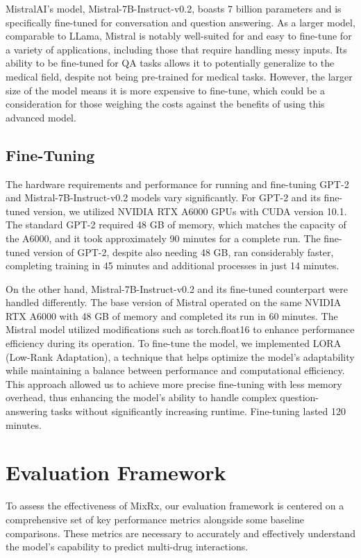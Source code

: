 \documentclass[11pt]{article}
\begin{document}
MistralAI's model, Mistral-7B-Instruct-v0.2, boasts 7 billion parameters and is specifically fine-tuned for conversation and question answering. As a larger model, comparable to LLama, Mistral is notably well-suited for and easy to fine-tune for a variety of applications, including those that require handling messy inputs. Its ability to be fine-tuned for QA tasks allows it to potentially generalize to the medical field, despite not being pre-trained for medical tasks. However, the larger size of the model means it is more expensive to fine-tune, which could be a consideration for those weighing the costs against the benefits of using this advanced model.

\subsection{Fine-Tuning}
The hardware requirements and performance for running and fine-tuning GPT-2 \cite{radford2019language} and Mistral-7B-Instruct-v0.2 \cite{jiang2023mistral} models vary significantly. For GPT-2 and its fine-tuned version, we utilized NVIDIA RTX A6000 GPUs with CUDA version 10.1. The standard GPT-2 required 48 GB of memory, which matches the capacity of the A6000, and it took approximately 90 minutes for a complete run. The fine-tuned version of GPT-2, despite also needing 48 GB, ran considerably faster, completing training in 45 minutes and additional processes in just 14 minutes.

On the other hand, Mistral-7B-Instruct-v0.2 and its fine-tuned counterpart were handled differently. The base version of Mistral operated on the same NVIDIA RTX A6000 with 48 GB of memory and completed its run in 60 minutes. The Mistral model utilized modifications such as torch.float16 to enhance performance efficiency during its operation. To fine-tune the model, we implemented LORA (Low-Rank Adaptation), a technique that helps optimize the model's adaptability while maintaining a balance between performance and computational efficiency. This approach allowed us to achieve more precise fine-tuning with less memory overhead, thus enhancing the model's ability to handle complex question-answering tasks without significantly increasing runtime. Fine-tuning lasted 120 minutes.

\section{Evaluation Framework}
To assess the effectiveness of MixRx, our evaluation framework is centered on a comprehensive set of key performance metrics alongside some baseline comparisons. These metrics are necessary to accurately and effectively understand the model's capability to predict multi-drug interactions.
\end{document}

